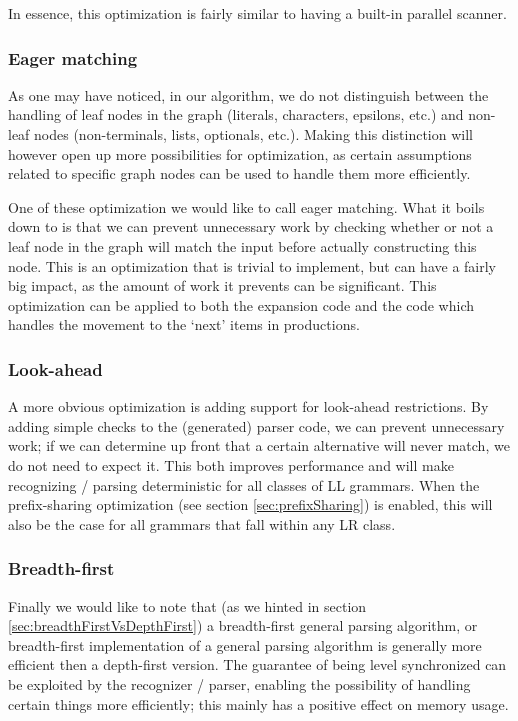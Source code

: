 \documentclass[a4paper,10pt]{article}
\begin{document}
In essence, this optimization is fairly similar to having a built-in parallel scanner.

\subsubsection{Eager matching}
As one may have noticed, in our algorithm, we do not distinguish between the handling of leaf nodes in the graph (literals, characters, epsilons, etc.) and non-leaf nodes (non-terminals, lists, optionals, etc.). Making this distinction will however open up more possibilities for optimization, as certain assumptions related to specific graph nodes can be used to handle them more efficiently.

One of these optimization we would like to call eager matching. What it boils down to is that we can prevent unnecessary work by checking whether or not a leaf node in the graph will match the input before actually constructing this node. This is an optimization that is trivial to implement, but can have a fairly big impact, as the amount of work it prevents can be significant. This optimization can be applied to both the expansion code and the code which handles the movement to the `next' items in productions.

\subsubsection{Look-ahead}
A more obvious optimization is adding support for look-ahead restrictions. By adding simple checks to the (generated) parser code, we can prevent unnecessary work; if we can determine up front that a certain alternative will never match, we do not need to expect it. This both improves performance and will make recognizing / parsing deterministic for all classes of LL grammars. When the prefix-sharing optimization (see section \ref{sec:prefixSharing}) is enabled, this will also be the case for all grammars that fall within any LR class.

\subsubsection{Breadth-first}
Finally we would like to note that (as we hinted in section \ref{sec:breadthFirstVsDepthFirst}) a breadth-first general parsing algorithm, or breadth-first implementation of a general parsing algorithm is generally more efficient then a depth-first version. The guarantee of being level synchronized can be exploited by the recognizer / parser, enabling the possibility of handling certain things more efficiently; this mainly has a positive effect on memory usage.
\end{document}
